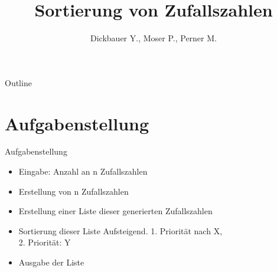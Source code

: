 

\title[BSP03 - Sortierung ZZ]{Sortierung von Zufallszahlen}
\author{Dickbauer Y., Moser P., Perner M.}



\begin{frame}
  \titlepage
\end{frame}

\begin{frame}{Outline}
  \tableofcontents
\end{frame}

\section{Aufgabenstellung}
\begin{frame}{Aufgabenstellung}

\begin{itemize}
  \item Eingabe: Anzahl an n Zufallszahlen
  \item Erstellung von n Zufallszahlen
  \item Erstellung einer Liste dieser generierten Zufallszahlen
  \item Sortierung dieser Liste Aufsteigend. 1. Priorität nach X, \\2. Priorität: Y
  \item Ausgabe der Liste
\end{itemize}

\end{frame}

